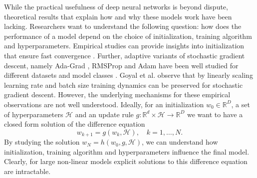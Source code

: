 \documentclass[12pt]{article}
\theoremstyle{definition}
\numberwithin{equation}{section}
\newcommand{\R}{\mathbb{R}}
\newcommand{\CH}{\mathcal{H}}
\begin{document}
While the practical usefulness of deep neural networks is beyond dispute, theoretical results that explain how and why these models work have been lacking. Researchers want to understand the following question: how does the performance of a model depend on the choice of initialization, training algorithm and hyperparameters. Empirical studies can provide insights into initialization that ensure fast convergence \cite{glorotUnderstandingDifficultyTraining2010, heDelvingDeepRectifiers2015a}. Further, adaptive variants of stochastic gradient descent, namely Ada-Grad \cite{duchiAdaptiveSubgradientMethods2011}, RMSProp \cite{geoffreyhintonnitishsrivastavaandkevinswer-NeuralNetworksMachine2012} and Adam \cite{kingmaAdamMethodStochastic2017} have been well studied for different datasets and model classes \cite{wilsonMarginalValueAdaptive2017}. Goyal et al. \cite{goyalAccurateLargeMinibatch2018} observe that by linearly scaling learning rate and batch size training dynamics can be preserved for stochastic gradient descent. 
However, the underlying mechanisms for these empirical observations are not well understood. Ideally, for an initialization $w_0 \in \R^D$, a set of hyperparameters $\CH$ and an update rule $g : \R^d \times \CH \rightarrow \R^D$ we want to have a closed form solution of the difference equation
\begin{equation*}
  w_{k+1} = g(w_k, \CH), \quad k=1,\dots, N.
\end{equation*} 
By studying the solution $w_N = h(w_0, g, \CH)$, we can understand how initialization, training algorithm and hyperparameters influence the final model. Clearly, for large non-linear models explicit solutions to this difference equation are intractable. 
\end{document}
